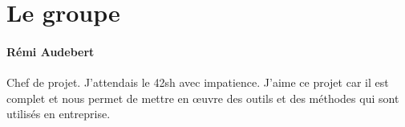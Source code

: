 \section{Le groupe}

\paragraph{Rémi Audebert} Chef de projet. J'attendais le 42sh avec impatience.
J'aime ce projet car il est complet et nous permet de mettre en œuvre des
outils et des méthodes qui sont utilisés en entreprise.
